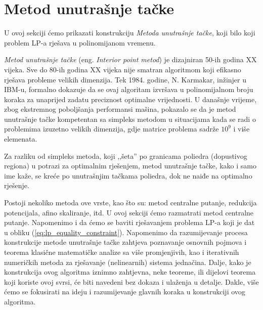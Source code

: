 \documentclass[a4paper, utf8, 11pt, colorlinks]{book}
\theoremstyle{definition}
\begin{document}
\appendix

\chapter{Metod unutrašnje tačke} \label{appendix:interior_point}



U ovoj sekciji ćemo prikazati konstrukciju  \emph{Metoda unutrašnje tačke}, koji  bilo koji problem LP-a rješava  u polinomijanom vremenu.


\emph{Metod unutrašnje tačke} (eng. \emph{Interior point metod}) je dizajniran 50-ih godina XX vijeka. Sve do 80-ih godina XX vijeka nije smatran algoritmom koji efikasno  rješava probleme velikih dimenzija. Tek 1984. godine, N. Karmakar, inžinjer u IBM-u,  formalno dokazuje da se ovaj algoritam izvršava u polinomijalnom broju koraka za unaprijed zadatu preciznost optimalne vrijednosti. U današnje vrijeme, zbog ekstremnog poboljšanja performansi mašina, pokazalo se da je {metod unutrašnje tačke} kompetentan sa simpleks metodom u situacijama kada se radi o problemima izuzetno velikih dimenzija, gdje matrice problema sadrže $10^9$ i više elemenata.

Za razliku od simpleks metoda, koji ,,šeta'' po granicama poliedra (dopustivog regiona) u potrazi za optimalnim rješenjem, {metod unutrašnje tačke}, kako i samo ime kaže, se kreće po unutrašnjim tačkama poliedra,  dok ne naiđe na  optimalno rješenje. 

Postoji nekoliko metoda ove vrste, kao što su: metod centralne putanje, redukcija potencijala, afino skaliranje, itd. U ovoj sekciji ćemo razmatrati metod centralne putanje. Napomenimo i da ćemo se baviti rješavanjem problema LP-a koji je dat u obliku (\ref{eq:lp_equality_constraint}). Napomenimo da razumijevanje procesa konstrukcije metode  unutrašnje tačke zahtjeva poznavanje osnovnih pojmova i teorema klasične matematičke analize sa više promjenjivih, kao i iterativnih numeričkih metoda za rješavanje (nelinearnih) sistema jednačina. Dalje, kako je konstrukcija ovog algoritma iznimno zahtjevna, neke teoreme, ili dijelovi teorema koji koriste ovoj svrsi, će biti  navedeni bez dokaza i ulaženja u detalje. Dakle, više ćemo se fokusirati na ideju i razumijevanje glavnih koraka u konstrukciji ovog algoritma.
\end{document}
